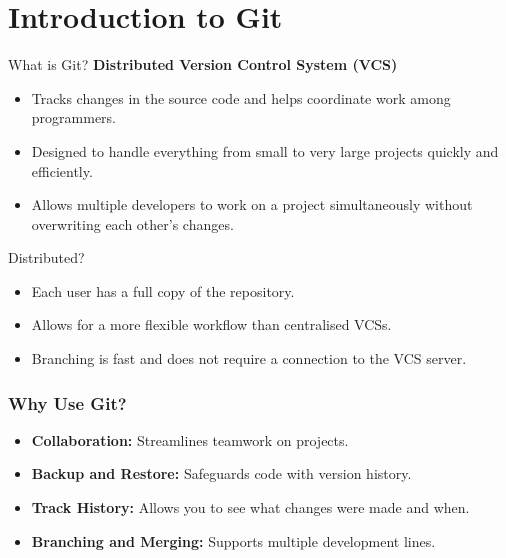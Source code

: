 
\subtitle{Lecture 2: Basics of Git and GitHub}



\begin{frame}
  \titlepage
\end{frame}

\section{Introduction to Git}
\begin{frame}
  \begin{block}{What is Git?}
    \textbf{Distributed Version Control System (VCS)} 
    \begin{itemize}
        \item Tracks changes in the source code and helps coordinate work among programmers.
        \item Designed to handle everything from small to very large projects quickly and efficiently. 
        \item Allows multiple developers to work on a project simultaneously without overwriting each other's changes. 
    \end{itemize}
  \end{block}

  \begin{block}{Distributed?}
  \justifying
  \begin{itemize}
      \item Each user has a full copy of the repository.
      \item Allows for a more flexible workflow than centralised VCSs.
      \item Branching is fast and does not require a connection to the VCS server.
  \end{itemize}
   \end{block}

\end{frame}


\begin{frame}
  \frametitle{Why Use Git?}
  \begin{itemize}
    \item \textbf{Collaboration:} Streamlines teamwork on projects.
    \item \textbf{Backup and Restore:} Safeguards code with version history.
    \item \textbf{Track History:} Allows you to see what changes were made and when.
    \item \textbf{Branching and Merging:} Supports multiple development lines.
  \end{itemize}
\end{frame}

